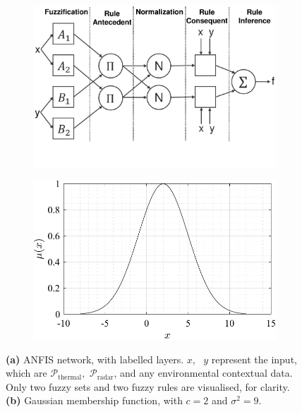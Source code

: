          \begin{figure}[htbp]
          \centering
          \begin{subfigure}[t]{0.48\textwidth} %
            \centering
            \includegraphics[width=\textwidth]{figs/Rory/ANFIS_diagram.pdf}
            \caption{}
            \label{fig:ANFIS_diagram}
          \end{subfigure}
          \hfill
          \begin{subfigure}[t]{0.48\textwidth} %
            \centering
            \includegraphics[width=\textwidth]{figs/Rory/mfs_plot.pdf}
            \caption{}
            \label{fig:membership_function_plot}
          \end{subfigure}
          \caption[ANFIS Network]{\textbf{(a)} ANFIS network, with labelled layers. $x, \text{ } y$ represent the input, which are $\mathcal{P}_\text{thermal},$ $\mathcal{P}_\text{radar}$, and any environmental contextual data. Only two fuzzy sets and two fuzzy rules are visualised, for clarity.\textbf{(b)} Gaussian membership function, with $c=2$ and $\sigma^2=9$.}
        \end{figure}

